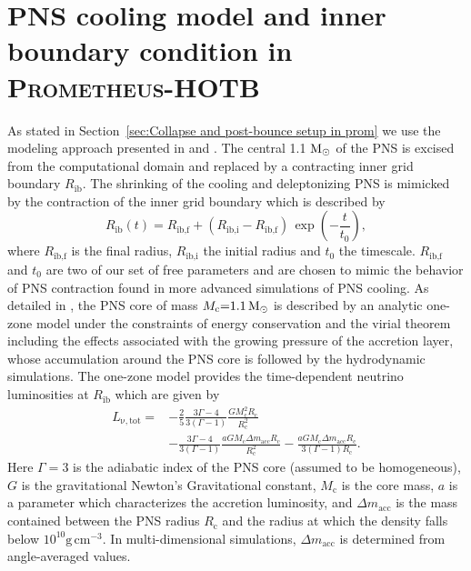 \documentclass[fleqn,usenatbib]{mnras}
\newcommand{\solm}{\ensuremath{\rm{M_{\odot}}}\xspace}
\newcommand{\gcc}{\text{g}\, \text{cm}^{-3}}
\newcommand{\prom}{\textsc{Prometheus-HOTB}\xspace}
\begin{document}
\section{PNS cooling model and inner boundary condition in \prom}
\label{Appendix:prom inner boundary}
As stated in Section~\ref{sec:Collapse and post-bounce setup in prom} we use the modeling approach presented in \cite{Ugliano2012} and \cite{Sukhbold2016}. 
The central 1.1 \solm of the PNS is excised from the computational domain and replaced by a contracting inner grid boundary $R_{\mathrm{ib}}$. The shrinking of the cooling and deleptonizing PNS is mimicked by the contraction of the inner grid boundary which is described by 
\begin{equation}
    R_{\text{ib}}(t) = R_{\text{ib,f}} + (R_{\text{ib,i}} - R_{\text{ib,f}})\, \exp\left(-\frac{t}{t_0}\right),
\end{equation}
where $R_{\text{ib,f}}$ is the final radius, $R_{\text{ib,i}}$ the initial radius and $t_0$ the timescale. $R_{\text{ib,f}}$ and $t_0$ are two of our set of free parameters and are chosen to mimic the behavior of PNS contraction found in more advanced simulations of PNS cooling.
As detailed in \cite{Ugliano2012}, the PNS core of mass $M_{\mathrm{c}}\mathord{=}1.1\,\solm$ is described by an analytic one-zone model under the constraints of energy conservation and the virial theorem including the effects associated with the growing pressure of the accretion layer, whose accumulation around the PNS core is followed by the hydrodynamic simulations. The one-zone model provides the time-dependent neutrino luminosities at $R_{\mathrm{ib}}$ which are given by 
\begin{equation}
\begin{split}
\label{eqn:lib}
    L_{\mathrm{\nu,tot}} = & - \frac{2}{5} \frac{3\Gamma - 4}{3(\Gamma - 1)} \frac{GM^2_{\mathrm{c}} R_{\mathrm{c}}}{R_{\mathrm{c}}^2} \\
            &  - \frac{3\Gamma - 4} {3(\Gamma - 1)} \frac{aGM_{\mathrm{c}}\Delta m_{\mathrm{acc}}R_\mathrm{c}}{R^2_{\mathrm{c}}}  -\frac{aGM_{\mathrm{c}}\Delta m_{\mathrm{acc}}R_{\mathrm{c}}}{3(\Gamma - 1)R_{\mathrm{c}}}.
\end{split}
\end{equation}
Here $\Gamma = 3$ is the adiabatic index of the PNS core (assumed to be homogeneous), $G$ is the gravitational Newton's Gravitational constant, $M_{\mathrm{c}}$ is the core mass, $a$ is a parameter which characterizes the accretion luminosity, and $\Delta m_{\mathrm{acc}}$ is the mass contained between the PNS radius $R_\mathrm{c}$ and the radius at which the density falls below $10^{10}\gcc$. In multi-dimensional simulations, $\Delta m_{\mathrm{acc}}$ is determined from angle-averaged values.
\end{document}
